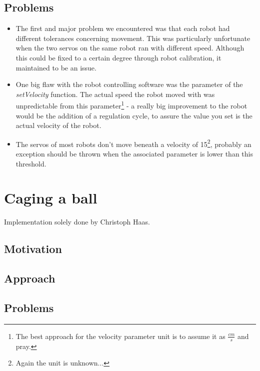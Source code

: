 \documentclass[703031]{iisreport}
\begin{document}
\subsection{Problems}
\label{subsec:motion_problems}
	\begin{itemize}
		\item 	The first and major problem we encountered was that each robot had different tolerances concerning movement. This was particularly unfortunate when the two servos on 
			the same robot ran with different speed. Although this could be fixed to a certain degree through robot calibration, it maintained to be an issue.
		\item	One big flaw with the robot controlling software was the parameter of the \emph{setVelocity} function. The actual speed the robot moved with was unpredictable from
			this parameter\footnote{The best approach for the velocity parameter unit is to assume it as $\frac{cm}{s}$ and pray.} - a really big improvement to the robot would be the
			addition of a regulation cycle, to assure the value you set is the actual velocity of the robot.
		\item 	The servos of most robots don't move beneath a velocity of 15\footnote{Again the unit is unknown...}, probably an exception should be thrown when the associated 			parameter is lower than this threshold.
	\end{itemize}


\section{Caging a ball}
\label{sec:caging}
Implementation solely done by Christoph Haas.

\subsection{Motivation}

\subsection{Approach}

\subsection{Problems}
\end{document}
